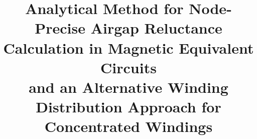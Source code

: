 \title{Analytical Method for Node-Precise Airgap Reluctance Calculation in
Magnetic Equivalent Circuits\\[0.4em]
\large and an Alternative Winding Distribution Approach for Concentrated
Windings}
\author{}
\date{}

\newcommand{\PaperAbstract}{%
This paper introduces two methodologies used for the design of electric
drives. The first method analytically calculates node-accurate cross-sectional
areas to determine rotor-position-dependent air-gap reluctances within the
scope of magnetic equivalent circuits. The second method focuses on
determining winding distribution for concentrated windings. Both approaches
are computationally efficient, requiring minimal code and straightforward
operations, making them well-suited for rapid implementation with low
resource consumption.}

\newif\ifshowbibliography
\showbibliographytrue
\newif\ifshowglossary
\showglossaryfalse
